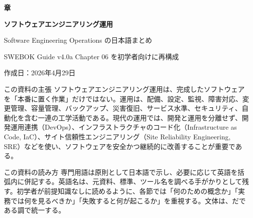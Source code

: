 \documentclass[uplatex,dvipdfmx,a4paper,10pt]{jsarticle}
\begin{document}
\begin{titlepage}
  \vspace*{10mm}
  {\sffamily\bfseries\fontsize{24}{28} 章\par}
  \vspace{3mm}
  {\sffamily\bfseries\fontsize{30}{34}\selectfont ソフトウェアエンジニアリング運用\par}
  \vspace{2mm}
  {\Large Software Engineering Operations の日本語まとめ\par}
  \vspace{3mm}
  {\large SWEBOK Guide v4.0a Chapter 06 を初学者向けに再構成\par}
  \vspace{4mm}
  作成日：2026年4月29日

  \vspace{8mm}
  \begin{pointbox}{この資料の主張}
  ソフトウェアエンジニアリング運用は、完成したソフトウェアを「本番に置く作業」だけではない。運用は、配備、設定、監視、障害対応、変更管理、容量管理、バックアップ、災害復旧、サービス水準、セキュリティ、自動化を含む一連の工学活動である。現代の運用では、開発と運用を分離せず、開発運用連携（DevOps）、インフラストラクチャのコード化（Infrastructure as Code, IaC）、サイト信頼性エンジニアリング（Site Reliability Engineering, SRE）などを使い、ソフトウェアを安全かつ継続的に改善することが重要である。
  \end{pointbox}

  \begin{pointbox}{この資料の読み方}
  専門用語は原則として日本語で示し、必要に応じて英語を括弧内に併記する。英語名は、元資料、標準、ツール名を調べる手がかりとして残す。初学者が前提知識なしに読めるように、各節では「何のための概念か」「実務では何を見るべきか」「失敗すると何が起こるか」を重視する。文体は、だである調で統一する。
  \end{pointbox}

  \vfill
  \begin{center}
  \end{center}
\end{titlepage}
\end{document}
